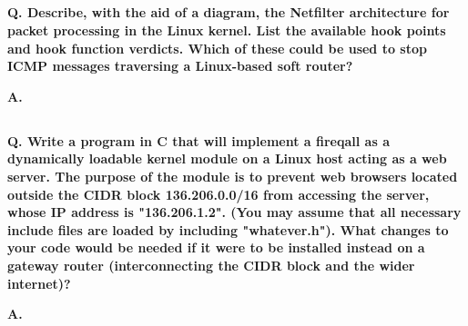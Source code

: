 \subsection{}

\textbf{Q. Describe, with the aid of a diagram, the Netfilter architecture for packet
processing in the Linux kernel. List the available hook points and hook function
verdicts. Which of these could be used to stop ICMP messages traversing a
Linux-based soft router?}

\textbf{A.}

\subsection{}

\textbf{Q. Write a program in C that will implement a fireqall as a dynamically loadable
kernel module on a Linux host acting as a web server. The purpose of the module
is to prevent web browsers located outside the CIDR block 136.206.0.0/16 from
accessing the server, whose IP address is "136.206.1.2". (You may assume that
all necessary include files are loaded by including "whatever.h"). What changes
to your code would be needed if it were to be installed instead on a gateway
router (interconnecting the CIDR block and the wider internet)?}

\textbf{A.}
